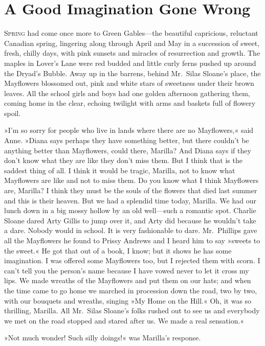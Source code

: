 \chapter{A Good Imagination Gone Wrong}

\lettrine[lines=4]{S}{pring} had come once more to Green Gables—the beautiful capricious, reluctant Canadian spring, lingering along through April and May in a succession of sweet, fresh, chilly days, with pink sunsets and miracles of resurrection and growth. The maples in Lover's Lane were red budded and little curly ferns pushed up around the Dryad's Bubble. Away up in the barrens, behind Mr.~Silas Sloane's place, the Mayflowers blossomed out, pink and white stars of sweetness under their brown leaves. All the school girls and boys had one golden afternoon gathering them, coming home in the clear, echoing twilight with arms and baskets full of flowery spoil.

»I'm so sorry for people who live in lands where there are no Mayflowers,« said Anne. »Diana says perhaps they have something better, but there couldn't be anything better than Mayflowers, could there, Marilla? And Diana says if they don't know what they are like they don't miss them. But I think that is the saddest thing of all. I think it would be tragic, Marilla, not to know what Mayflowers are like and not to miss them. Do you know what I think Mayflowers are, Marilla? I think they must be the souls of the flowers that died last summer and this is their heaven. But we had a splendid time today, Marilla. We had our lunch down in a big mossy hollow by an old well—such a romantic spot. Charlie Sloane dared Arty Gillis to jump over it, and Arty did because he wouldn't take a dare. Nobody would in school. It is very fashionable to dare. Mr.~Phillips gave all the Mayflowers he found to Prissy Andrews and I heard him to say »sweets to the sweet.« He got that out of a book, I know; but it shows he has some imagination. I was offered some Mayflowers too, but I rejected them with scorn. I can't tell you the person's name because I have vowed never to let it cross my lips. We made wreaths of the Mayflowers and put them on our hats; and when the time came to go home we marched in procession down the road, two by two, with our bouquets and wreaths, singing »My Home on the Hill.« Oh, it was so thrilling, Marilla. All Mr.~Silas Sloane's folks rushed out to see us and everybody we met on the road stopped and stared after us. We made a real sensation.«

»Not much wonder! Such silly doings!« was Marilla's response.

